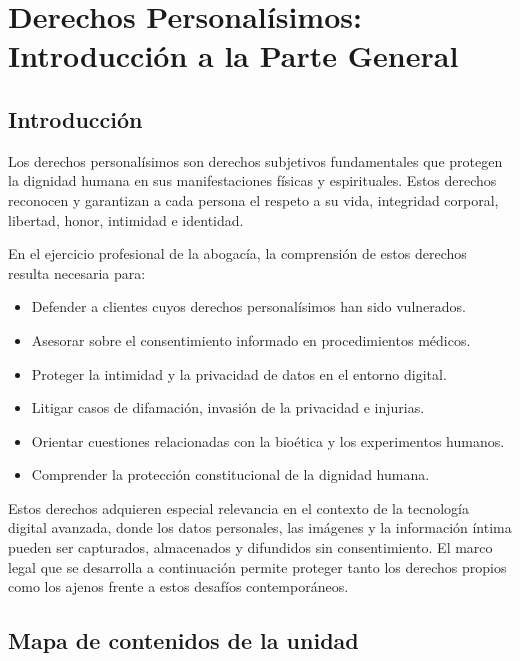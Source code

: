 \documentclass[12pt,oneside]{book}
\begin{document}
\chapter[Derechos Personalísimos]{Derechos Personalísimos: Introducción a la Parte General}

\section{Introducción}

Los derechos personalísimos son derechos subjetivos fundamentales que protegen la dignidad humana en sus manifestaciones físicas y espirituales. Estos derechos reconocen y garantizan a cada persona el respeto a su vida, integridad corporal, libertad, honor, intimidad e identidad.

En el ejercicio profesional de la abogacía, la comprensión de estos derechos resulta necesaria para:

\begin{itemize}
    \item Defender a clientes cuyos derechos personalísimos han sido vulnerados.
    \item Asesorar sobre el consentimiento informado en procedimientos médicos.
    \item Proteger la intimidad y la privacidad de datos en el entorno digital.
    \item Litigar casos de difamación, invasión de la privacidad e injurias.
    \item Orientar cuestiones relacionadas con la bioética y los experimentos humanos.
    \item Comprender la protección constitucional de la dignidad humana.
\end{itemize}

Estos derechos adquieren especial relevancia en el contexto de la tecnología digital avanzada, donde los datos personales, las imágenes y la información íntima pueden ser capturados, almacenados y difundidos sin consentimiento. El marco legal que se desarrolla a continuación permite proteger tanto los derechos propios como los ajenos frente a estos desafíos contemporáneos.

\section{Mapa de contenidos de la unidad}
\end{document}
